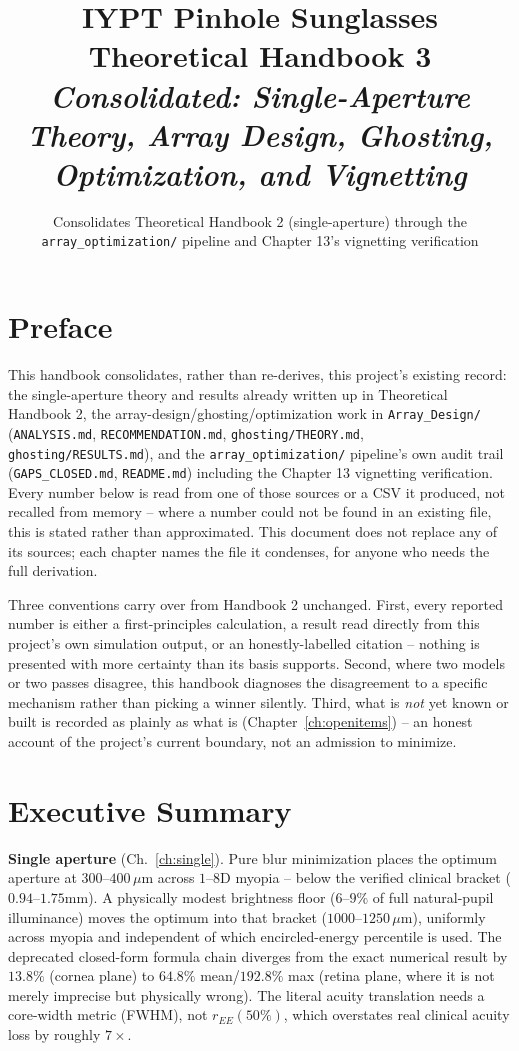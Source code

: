 \documentclass[11pt]{report}
\title{\textbf{\Huge IYPT Pinhole Sunglasses}\\[0.3cm]\textcolor{hbblue}{\huge Theoretical Handbook 3}\\[0.5cm]
\large\itshape Consolidated: Single-Aperture Theory, Array Design, Ghosting, Optimization,
and Vignetting}
\author{}
\date{Consolidates Theoretical Handbook 2 (single-aperture) through the
\texttt{array\_optimization/} pipeline and Chapter 13's vignetting verification}
\begin{document}
\maketitle
\tableofcontents

\chapter*{Preface}
This handbook consolidates, rather than re-derives, this project's existing record: the
single-aperture theory and results already written up in Theoretical Handbook 2, the
array-design/ghosting/optimization work in \texttt{Array\_Design/} (\texttt{ANALYSIS.md},
\texttt{RECOMMENDATION.md}, \texttt{ghosting/THEORY.md}, \texttt{ghosting/RESULTS.md}), and
the \texttt{array\_optimization/} pipeline's own audit trail (\texttt{GAPS\_CLOSED.md},
\texttt{README.md}) including the Chapter 13 vignetting verification. Every number below is
read from one of those sources or a CSV it produced, not recalled from memory -- where a
number could not be found in an existing file, this is stated rather than approximated. This
document does not replace any of its sources; each chapter names the file it condenses, for
anyone who needs the full derivation.

Three conventions carry over from Handbook 2 unchanged. First, every reported number is
either a first-principles calculation, a result read directly from this project's own
simulation output, or an honestly-labelled citation -- nothing is presented with more
certainty than its basis supports. Second, where two models or two passes disagree, this
handbook diagnoses the disagreement to a specific mechanism rather than picking a winner
silently. Third, what is \emph{not} yet known or built is recorded as plainly as what is
(Chapter~\ref{ch:openitems}) -- an honest account of the project's current boundary, not an
admission to minimize.

\chapter*{Executive Summary}
\textbf{Single aperture} (Ch.~\ref{ch:single}). Pure blur minimization places the optimum
aperture at $300$--$400\,\mu$m across $1$--$8$D myopia -- below the verified clinical
bracket ($0.94$--$1.75$mm). A physically modest brightness floor ($6$--$9\%$ of full
natural-pupil illuminance) moves the optimum into that bracket ($1000$--$1250\,\mu$m),
uniformly across myopia and independent of which encircled-energy percentile is used. The
deprecated closed-form formula chain diverges from the exact numerical result by $13.8\%$
(cornea plane) to $64.8\%$ mean/$192.8\%$ max (retina plane, where it is not merely
imprecise but physically wrong). The literal acuity translation needs a core-width metric
(FWHM), not $r_{EE}(50\%)$, which overstates real clinical acuity loss by roughly $7\times$.
\end{document}
